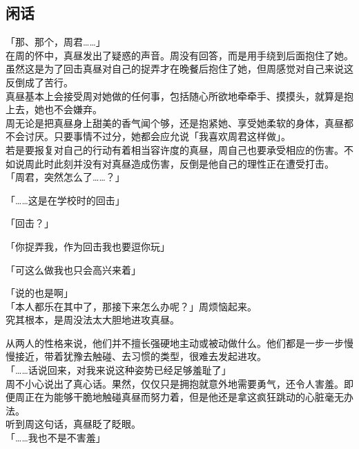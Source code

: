 \subsection{闲话}

「那、那个，周君……」\\

在周的怀中，真昼发出了疑惑的声音。周没有回答，而是用手绕到后面抱住了她。\\

虽然这是为了回击真昼对自己的捉弄才在晚餐后抱住了她，但周感觉对自己来说这反倒成了苦行。\\

真昼基本上会接受周对她做的任何事，包括随心所欲地牵牵手、摸摸头，就算是抱上去，她也不会嫌弃。\\

周无论是把真昼身上甜美的香气闻个够，还是抱紧她、享受她柔软的身体，真昼都不会讨厌。只要事情不过分，她都会应允说「我喜欢周君这样做」。\\

若是要报复对自己的行动有着相当容许度的真昼，周自己也要承受相应的伤害。不如说周此时此刻并没有对真昼造成伤害，反倒是他自己的理性正在遭受打击。\\

「周君，突然怎么了……？」

「……这是在学校时的回击」

「回击？」

「你捉弄我，作为回击我也要逗你玩」

「可这么做我也只会高兴来着」

「说的也是啊」\\

「本人都乐在其中了，那接下来怎么办呢？」周烦恼起来。\\

究其根本，是周没法太大胆地进攻真昼。

从两人的性格来说，他们并不擅长强硬地主动或被动做什么。他们都是一步一步慢慢接近，带着犹豫去触碰、去习惯的类型，很难去发起进攻。\\

「……话说回来，对我来说这种姿势已经足够羞耻了」\\

周不小心说出了真心话。果然，仅仅只是拥抱就意外地需要勇气，还令人害羞。即便周正在为能够干脆地触碰真昼而努力着，但是他还是拿这疯狂跳动的心脏毫无办法。\\

听到周这句话，真昼眨了眨眼。\\

「……我也不是不害羞」

